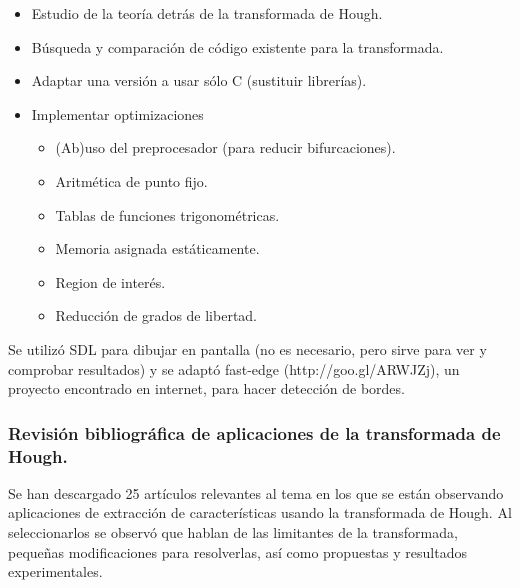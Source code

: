 \begin{itemize}
	\item Estudio de la teoría detrás de la transformada de Hough.
	\item Búsqueda y comparación de código existente para la transformada.
	\item Adaptar una versión a usar sólo C (sustituir librerías).
	\item Implementar optimizaciones
	\begin{itemize}
		\item (Ab)uso del preprocesador (para reducir bifurcaciones). 
		\item Aritmética de punto fijo.
		\item Tablas de funciones trigonométricas.
		\item Memoria asignada estáticamente.
		\item Region de interés.
		\item Reducción de grados de libertad.
	\end{itemize}
\end{itemize}

Se utilizó SDL para dibujar en pantalla (no es necesario, pero sirve para ver y comprobar resultados) y se adaptó fast-edge (http://goo.gl/ARWJZj), un proyecto encontrado en internet, para hacer detección de bordes.


\subsubsection{Revisión bibliográfica de aplicaciones de la transformada de Hough.}
Se han descargado 25 artículos relevantes al tema en los que se están observando aplicaciones de extracción de características usando la transformada de Hough. Al seleccionarlos se observó que hablan de las limitantes de la transformada, pequeñas modificaciones para resolverlas, así como propuestas y resultados experimentales.

